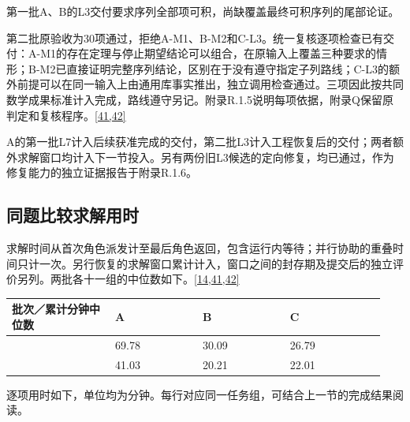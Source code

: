 第一批A、B的L3交付要求序列全部项可积，尚缺覆盖最终可积序列的尾部论证。

第二批原验收为30项通过，拒绝A-M1、B-M2和C-L3。统一复核逐项检查已有交付：A-M1的存在定理与停止期望结论可以组合，在原输入上覆盖三种要求的情形；B-M2已直接证明完整序列结论，区别在于没有遵守指定子列路线；C-L3的额外前提可以在同一输入上由通用库事实推出，独立调用检查通过。三项因此按共同数学成果标准计入完成，路线遵守另记。附录R.1.5说明每项依据，附录Q保留原判定和复核程序。\hyperlink{ref-41}{\mbox{[41,42]}}

A的第一批L7计入后续获准完成的交付，第二批L3计入工程恢复后的交付；两者额外求解窗口均计入下一节投入。另有两份旧L3候选的定向修复，均已通过，作为修复能力的独立证据报告于附录R.1.6。

\subsection[同题比较求解用时]{\texorpdfstring{\protect\hypertarget{section-3-2}{}同题比较求解用时}{同题比较求解用时}}
求解时间从首次角色派发计至最后角色返回，包含运行内等待；并行协助的重叠时间只计一次。另行恢复的求解窗口累计计入，窗口之间的封存期及提交后的独立评价另列。两批各十一组的中位数如下。\hyperlink{ref-14}{\mbox{[14,41,42]}}

\begingroup\small\setlength{\tabcolsep}{3pt}\renewcommand{\arraystretch}{1.14}
\par\nopagebreak\medskip\noindent\begin{minipage}[t]{\linewidth}
\begin{tabular}{>{\raggedright\arraybackslash}p{0.26\linewidth}>{\raggedright\arraybackslash}p{0.22\linewidth}>{\raggedright\arraybackslash}p{0.22\linewidth}>{\raggedright\arraybackslash}p{0.24\linewidth}}
\toprule
\textbf{批次／累计分钟中位数} & \textbf{A} & \textbf{B} & \textbf{C}\\\midrule

{1} & {69.78} & {30.09} & {26.79}\\
{2} & {41.03} & {20.21} & {22.01}\\
\bottomrule\end{tabular}\end{minipage}\par\medskip\endgroup
逐项用时如下，单位均为分钟。每行对应同一任务组，可结合上一节的完成结果阅读。

